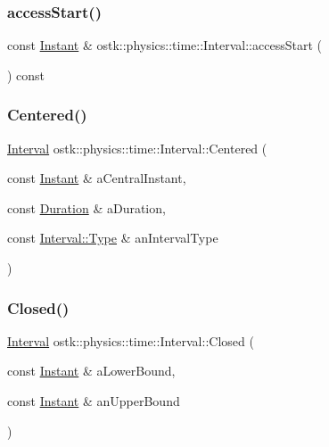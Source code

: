 \subsubsection{\texorpdfstring{access\+Start()}{accessStart()}}
{\footnotesize\ttfamily const \hyperlink{classostk_1_1physics_1_1time_1_1_instant}{Instant} \& ostk\+::physics\+::time\+::\+Interval\+::access\+Start (\begin{DoxyParamCaption}{ }\end{DoxyParamCaption}) const}

\mbox{\label{classostk_1_1physics_1_1time_1_1_interval_aad7763c91cd880c3a90127d1b147a0fa}} 
\subsubsection{\texorpdfstring{Centered()}{Centered()}}
{\footnotesize\ttfamily \hyperlink{classostk_1_1physics_1_1time_1_1_interval}{Interval} ostk\+::physics\+::time\+::\+Interval\+::\+Centered (\begin{DoxyParamCaption}\item[{const \hyperlink{classostk_1_1physics_1_1time_1_1_instant}{Instant} \&}]{a\+Central\+Instant,  }\item[{const \hyperlink{classostk_1_1physics_1_1time_1_1_duration}{Duration} \&}]{a\+Duration,  }\item[{const \hyperlink{classostk_1_1physics_1_1time_1_1_interval_a7011137ee6d84ebb8705c95d88f87818}{Interval\+::\+Type} \&}]{an\+Interval\+Type }\end{DoxyParamCaption})\hspace{0.3cm}{\ttfamily [static]}}

\mbox{\label{classostk_1_1physics_1_1time_1_1_interval_aa8d39973df40ac95b27cc460e86e3aa7}} 
\subsubsection{\texorpdfstring{Closed()}{Closed()}}
{\footnotesize\ttfamily \hyperlink{classostk_1_1physics_1_1time_1_1_interval}{Interval} ostk\+::physics\+::time\+::\+Interval\+::\+Closed (\begin{DoxyParamCaption}\item[{const \hyperlink{classostk_1_1physics_1_1time_1_1_instant}{Instant} \&}]{a\+Lower\+Bound,  }\item[{const \hyperlink{classostk_1_1physics_1_1time_1_1_instant}{Instant} \&}]{an\+Upper\+Bound }\end{DoxyParamCaption})\hspace{0.3cm}{\ttfamily [static]}}



